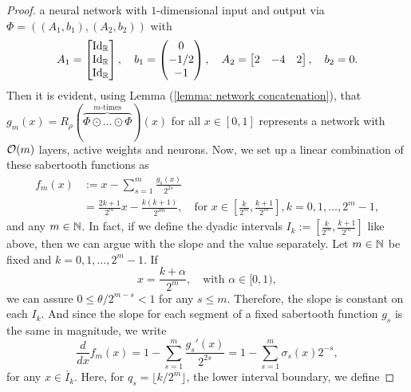 \begin{proof}
    a neural network with $1$-dimensional input and output via $\Phi = ((A_1, b_1), (A_2, b_2))$ with
    \begin{equation*}
        A_1 = \begin{bmatrix}
            \text{Id}_{\mathbb{R}} \\ \text{Id}_{\mathbb{R}} \\ \text{Id}_{\mathbb{R}}
        \end{bmatrix}, \quad
        b_1 = \begin{pmatrix}
            0 \\ -1/2 \\ -1
        \end{pmatrix}, \quad
        A_2 = \begin{bmatrix}
            2 & -4 & 2 
        \end{bmatrix}, \quad
        b_2 = 0.
    \end{equation*}
    Then it is evident, using Lemma (\ref{lemma: network concatenation}), that $g_m(x) = R_\rho(\overbrace{\Phi \odot \dots \odot \Phi}^{m \text{-times}})(x)$ 
    for all $x \in [0, 1]$ represents a network with $\mathcal{O}(m)$ layers, active weights and neurons. 
    Now, we set up a linear combination of these sabertooth functions as 
    \begin{align*}
        f_m(x) &:= x - \sum_{s=1}^m \frac{g_s(x)}{2^{2s}} \\
        &= \frac{2k+1}{2^m} x - \frac{k(k+1)}{2^{2m}}, \quad \text{for } x \in \left[\frac{k}{2^m}, \frac{k+1}{2^m}\right], 
        k = 0, 1, \dots, 2^m - 1,
    \end{align*}
    and any $m \in \mathbb{N}$. In fact, if we define the dyadic intervals $I_k := [\frac{k}{2^m}, \frac{k+1}{2^m}]$ like above, 
    then we can argue with the slope and the value separately. Let $m \in \mathbb{N}$ be fixed and $k = 0, 1, \dots, 2^m - 1$. If 
    \begin{equation*}
        x = \frac{k + \alpha}{2^m}, \quad \text{with } \alpha \in [0, 1),
    \end{equation*}
    we can assure $0 \leq \theta/2^{m-s} < 1$ for any $s \leq m$. Therefore, the slope is constant on each $I_k$. 
    And since the slope for each segment of a fixed sabertooth function $g_s$ is the same in magnitude,
    we write
    \begin{equation*}
        \frac{d}{dx} f_m(x) = 1 - \sum_{s=1}^m \frac{g_s'(x)}{2^{2s}} = 1 - \sum_{s=1}^m \sigma_s(x) 2^{-s},
    \end{equation*}
    for any $x \in \mathring{I_k}$. Here, for $q_s = \lfloor k/2^m \rfloor$, the lower interval boundary, we define

\end{proof}
